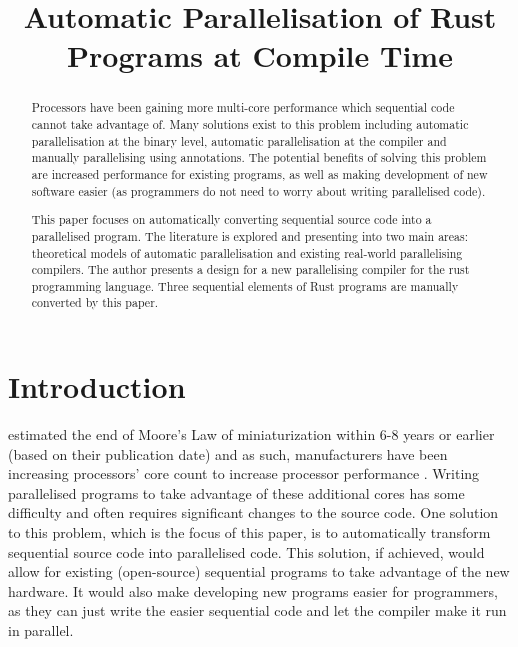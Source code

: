 \documentclass[conference]{IEEEtran}
\begin{document}
\title{Automatic Parallelisation of Rust Programs at Compile Time}

\author{
\and
{}
}

\maketitle

\begin{abstract}
  Processors have been gaining more multi-core performance which sequential code cannot take advantage of. Many solutions exist to this problem including automatic parallelisation at the binary level, automatic parallelisation at the compiler and manually parallelising using annotations. The potential benefits of solving this problem are increased performance for existing programs, as well as making development of new software easier (as programmers do not need to worry about writing parallelised code).

  This paper focuses on automatically converting sequential source code into a parallelised program. The literature is explored and presenting into two main areas: theoretical models of automatic parallelisation and existing real-world parallelising compilers.
  The author presents a design for a new parallelising compiler for the rust programming language. Three sequential elements of Rust programs are manually converted by this paper.
\end{abstract}

\section{Introduction}
\textcite{Kish2002} estimated the end of Moore's Law of miniaturization within 6-8 years or earlier (based on their publication date) and as such, manufacturers have been increasing processors' core count to increase processor performance \parencite{Geer2005}. Writing parallelised programs to take advantage of these additional cores has some difficulty and often requires significant changes to the source code. One solution to this problem, which is the focus of this paper, is to automatically transform sequential source code into parallelised code. This solution, if achieved, would allow for existing (open-source) sequential programs to take advantage of the new hardware. It would also make developing new programs easier for programmers, as they can just write the easier sequential code and let the compiler make it run in parallel.
\end{document}
